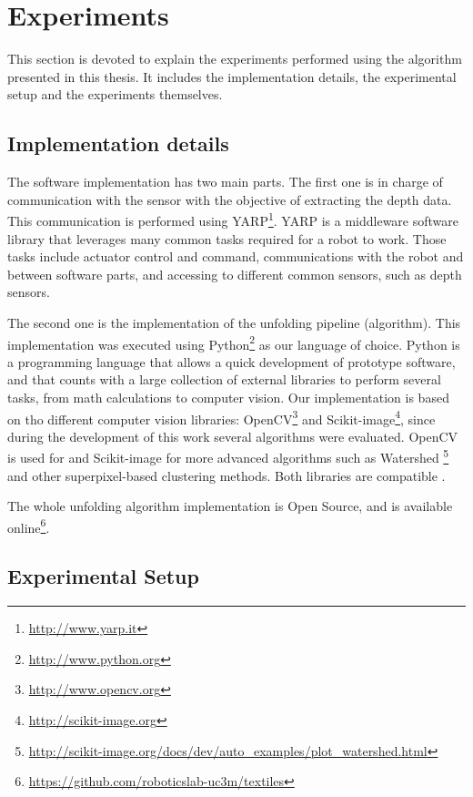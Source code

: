 \section{Experiments}
\label{experiments}

This section is devoted to explain the experiments performed using the algorithm presented in this thesis. It includes the implementation details, the experimental setup and the experiments themselves.

\subsection{Implementation details}
\label{experiments:implementation}
The software implementation has two main parts. The first one is in charge of communication with the sensor with the objective of extracting the depth data. This communication is performed using YARP\footnote{\url{http://www.yarp.it}}. YARP is a middleware software library  that leverages many common tasks required for a robot to work. Those tasks include actuator control and command, communications with the robot and between software parts, and accessing to different common sensors, such as depth sensors.

The second one is the implementation of the unfolding pipeline (algorithm). This implementation was executed using Python\footnote{\url{http://www.python.org}} as our language of choice. Python is a programming language that allows a quick development of prototype software, and that counts with a large collection of external libraries  to perform several tasks, from math calculations to computer vision. Our implementation is based on tho different computer vision libraries: OpenCV\footnote{\url{http://www.opencv.org}} and Scikit-image\footnote{\url{http://scikit-image.org}}, since during the development of this work several algorithms were evaluated. OpenCV is used for  and Scikit-image for more advanced algorithms such as Watershed \footnote{\url{http://scikit-image.org/docs/dev/auto_examples/plot_watershed.html}} and other superpixel-based clustering methods. Both libraries are compatible .

The whole unfolding algorithm implementation is Open Source, and is available online\footnote{\url{https://github.com/roboticslab-uc3m/textiles}}.

\subsection{Experimental Setup}
\label{experiments:expermimental_setup}

